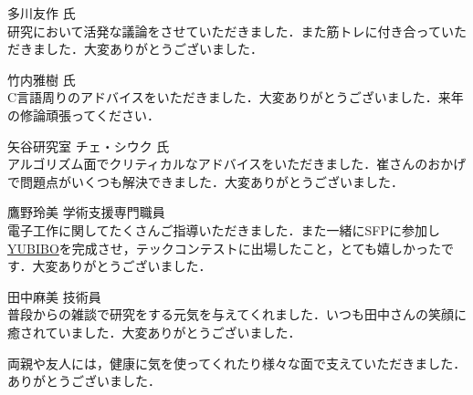 多川友作 氏\\
研究において活発な議論をさせていただきました．また筋トレに付き合っていただきました．大変ありがとうございました．

竹内雅樹 氏\\
C言語周りのアドバイスをいただきました．大変ありがとうございました．来年の修論頑張ってください．

矢谷研究室 チェ・シウク 氏\\
アルゴリズム面でクリティカルなアドバイスをいただきました．崔さんのおかげで問題点がいくつも解決できました．大変ありがとうございました．

鷹野玲美 学術支援専門職員\\
電子工作に関してたくさんご指導いただきました．また一緒にSFPに参加し\href{https://qiita.com/yumion/items/b7fa89f29504cab1f123}{YUBIBO}を完成させ，テックコンテストに出場したこと，とても嬉しかったです．大変ありがとうございました．

田中麻美 技術員\\
普段からの雑談で研究をする元気を与えてくれました．いつも田中さんの笑顔に癒されていました．大変ありがとうございました．

\vspace{12pt}
両親や友人には，健康に気を使ってくれたり様々な面で支えていただきました．ありがとうございました．

